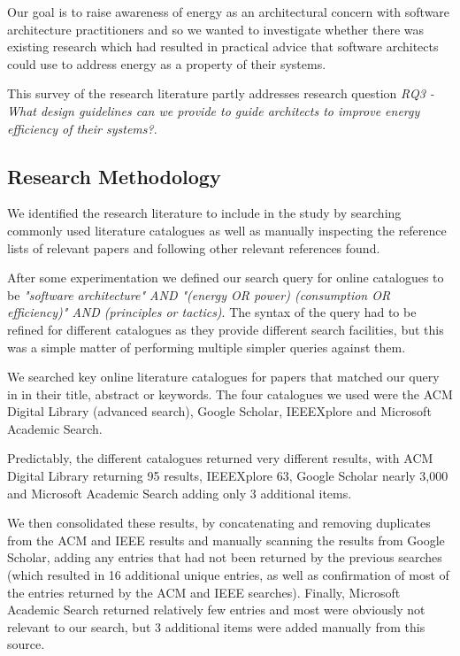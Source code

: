 Our goal is to raise awareness of energy as an architectural concern with software architecture practitioners and so we wanted to investigate whether there was existing research which had resulted in practical advice that software architects could use to address energy as a property of their systems.

This survey of the research literature partly addresses research question \emph{RQ3 -  What design guidelines can we provide to guide architects to improve energy efficiency of their systems?}.

\subsection{Research Methodology}

We identified the research literature to include in the study by searching commonly used literature catalogues as well as manually inspecting the reference lists of relevant papers and following other relevant references found.

After some experimentation we defined our search query for online catalogues to be \emph{"software architecture" AND "(energy OR power) (consumption OR efficiency)" AND (principles or tactics)}.  The syntax of the query had to be refined for different catalogues as they provide different search facilities, but this was a simple matter of performing multiple simpler queries against them.

We searched key online literature catalogues for papers that matched our query in in their title, abstract or keywords.  The four catalogues we used were the ACM Digital Library (advanced search), Google Scholar, IEEEXplore and Microsoft Academic Search.

Predictably, the different catalogues returned very different results, with ACM Digital Library returning 95 results, IEEEXplore 63, Google Scholar nearly 3,000 and Microsoft Academic Search adding only 3 additional items.

We then consolidated these results, by concatenating and removing duplicates from the ACM and IEEE results and manually scanning the results from Google Scholar, adding any entries that had not been returned by the previous searches (which resulted in 16 additional unique entries, as well as confirmation of most of the entries returned by the ACM and IEEE searches).  Finally, Microsoft Academic Search returned relatively few entries and most were obviously not relevant to our search, but 3 additional items were added manually from this source.

